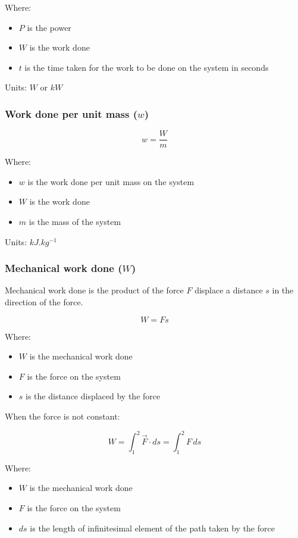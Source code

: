 \documentclass[11pt]{article}
\begin{document}
Where:
\begin{itemize}
\item \(P\) is the power
\item \(W\) is the work done
\item \(t\) is the time taken for the work to be done on the system in seconds
\end{itemize}

Units: \(\unit{W}\) or \(\unit{kW}\)

\newpage

\subsubsection{Work done per unit mass (\(w\))}
\label{sec:org884b5d8}
\[w = \frac{W}{m}\]

Where:
\begin{itemize}
\item \(w\) is the work done per unit mass on the system
\item \(W\) is the work done
\item \(m\) is the mass of the system
\end{itemize}

Units: \(\unit{kJ.kg^{-1}}\)

\subsubsection{Mechanical work done (\(W\))}
\label{sec:org2309475}
Mechanical work done is the product of the force \(F\) displace a distance \(s\) in the direction of the force.

\[W = Fs\]

Where:
\begin{itemize}
\item \(W\) is the mechanical work done
\item \(F\) is the force on the system
\item \(s\) is the distance displaced by the force
\end{itemize}

When the force is not constant:

\[W = \int_1^2 \vec{F} \cdot ds = \int_1^2 F \, ds\]

Where:
\begin{itemize}
\item \(W\) is the mechanical work done
\item \(F\) is the force on the system
\item \(ds\) is the length of infinitesimal element of the path taken by the force
\end{itemize}
\end{document}
